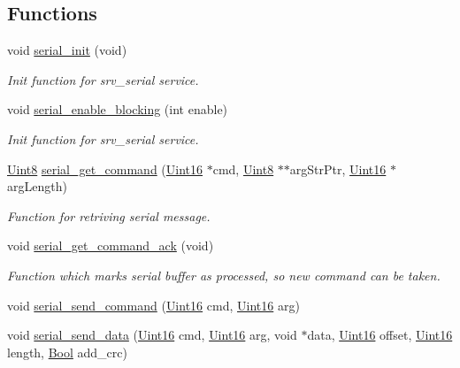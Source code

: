 \subsection*{Functions}
\begin{DoxyCompactItemize}
\item 
void \hyperlink{a00031_ad2b461e9e9044364a28a61cfadcacdd8}{serial\+\_\+init} (void)
\begin{DoxyCompactList}\small\item\em Init function for srv\+\_\+serial service. \end{DoxyCompactList}\item 
void \hyperlink{a00031_af15ca641f181de14f789d97b00c367ef}{serial\+\_\+enable\+\_\+blocking} (int enable)
\begin{DoxyCompactList}\small\item\em Init function for srv\+\_\+serial service. \end{DoxyCompactList}\item 
\hyperlink{a00072_af84840501dec18061d18a68c162a8fa2}{Uint8} \hyperlink{a00031_a366b2707f4c7d76f0efc1b5cdde8e37e}{serial\+\_\+get\+\_\+command} (\hyperlink{a00072_a59a9f6be4562c327cbfb4f7e8e18f08b}{Uint16} $\ast$cmd, \hyperlink{a00072_af84840501dec18061d18a68c162a8fa2}{Uint8} $\ast$$\ast$arg\+Str\+Ptr, \hyperlink{a00072_a59a9f6be4562c327cbfb4f7e8e18f08b}{Uint16} $\ast$arg\+Length)
\begin{DoxyCompactList}\small\item\em Function for retriving serial message. \end{DoxyCompactList}\item 
void \hyperlink{a00031_a7fc7421ed15d6e4516e9878e7455d715}{serial\+\_\+get\+\_\+command\+\_\+ack} (void)
\begin{DoxyCompactList}\small\item\em Function which marks serial buffer as processed, so new command can be taken. \end{DoxyCompactList}\item 
void \hyperlink{a00031_aaac89aaa2fbc24d91501b0695195b235}{serial\+\_\+send\+\_\+command} (\hyperlink{a00072_a59a9f6be4562c327cbfb4f7e8e18f08b}{Uint16} cmd, \hyperlink{a00072_a59a9f6be4562c327cbfb4f7e8e18f08b}{Uint16} arg)
\item 
void \hyperlink{a00031_ac9bd1d3814679f03e2a9bfa63a221946}{serial\+\_\+send\+\_\+data} (\hyperlink{a00072_a59a9f6be4562c327cbfb4f7e8e18f08b}{Uint16} cmd, \hyperlink{a00072_a59a9f6be4562c327cbfb4f7e8e18f08b}{Uint16} arg, void $\ast$data, \hyperlink{a00072_a59a9f6be4562c327cbfb4f7e8e18f08b}{Uint16} offset, \hyperlink{a00072_a59a9f6be4562c327cbfb4f7e8e18f08b}{Uint16} length, \hyperlink{a00072_a253b248072cfc8bd812c69acd0046eed}{Bool} add\+\_\+crc)
$$
\end{DoxyCompactItemize}
